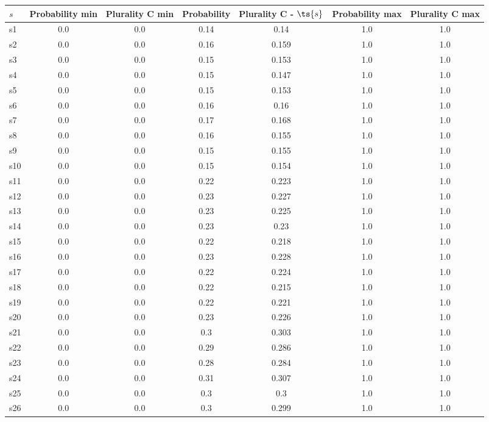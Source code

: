 \documentclass{article}
\begin{document}
\noindent\begin{tabular}{|l|c|c|c|c|c|c|}
\hline
$s$& Probability min & Plurality C min & Probability & Plurality C - $\ts{s}$ & Probability max & Plurality C max\\
\hline
s1 &0.0 & 0.0 & 0.14 & 0.14 & 1.0 & 1.0\\
\hline
s2 &0.0 & 0.0 & 0.16 & 0.159 & 1.0 & 1.0\\
\hline
s3 &0.0 & 0.0 & 0.15 & 0.153 & 1.0 & 1.0\\
\hline
s4 &0.0 & 0.0 & 0.15 & 0.147 & 1.0 & 1.0\\
\hline
s5 &0.0 & 0.0 & 0.15 & 0.153 & 1.0 & 1.0\\
\hline
s6 &0.0 & 0.0 & 0.16 & 0.16 & 1.0 & 1.0\\
\hline
s7 &0.0 & 0.0 & 0.17 & 0.168 & 1.0 & 1.0\\
\hline
s8 &0.0 & 0.0 & 0.16 & 0.155 & 1.0 & 1.0\\
\hline
s9 &0.0 & 0.0 & 0.15 & 0.155 & 1.0 & 1.0\\
\hline
s10 &0.0 & 0.0 & 0.15 & 0.154 & 1.0 & 1.0\\
\hline
s11 &0.0 & 0.0 & 0.22 & 0.223 & 1.0 & 1.0\\
\hline
s12 &0.0 & 0.0 & 0.23 & 0.227 & 1.0 & 1.0\\
\hline
s13 &0.0 & 0.0 & 0.23 & 0.225 & 1.0 & 1.0\\
\hline
s14 &0.0 & 0.0 & 0.23 & 0.23 & 1.0 & 1.0\\
\hline
s15 &0.0 & 0.0 & 0.22 & 0.218 & 1.0 & 1.0\\
\hline
s16 &0.0 & 0.0 & 0.23 & 0.228 & 1.0 & 1.0\\
\hline
s17 &0.0 & 0.0 & 0.22 & 0.224 & 1.0 & 1.0\\
\hline
s18 &0.0 & 0.0 & 0.22 & 0.215 & 1.0 & 1.0\\
\hline
s19 &0.0 & 0.0 & 0.22 & 0.221 & 1.0 & 1.0\\
\hline
s20 &0.0 & 0.0 & 0.23 & 0.226 & 1.0 & 1.0\\
\hline
s21 &0.0 & 0.0 & 0.3 & 0.303 & 1.0 & 1.0\\
\hline
s22 &0.0 & 0.0 & 0.29 & 0.286 & 1.0 & 1.0\\
\hline
s23 &0.0 & 0.0 & 0.28 & 0.284 & 1.0 & 1.0\\
\hline
s24 &0.0 & 0.0 & 0.31 & 0.307 & 1.0 & 1.0\\
\hline
s25 &0.0 & 0.0 & 0.3 & 0.3 & 1.0 & 1.0\\
\hline
s26 &0.0 & 0.0 & 0.3 & 0.299 & 1.0 & 1.0\\
\hline

\end{tabular}
\end{document}
